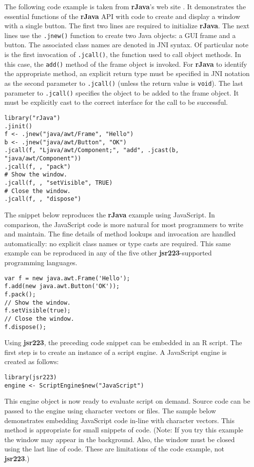 The following code example is taken from \textbf{rJava}'s web site \citep{rjavaweb}. It demonstrates the essential functions of the \textbf{rJava} API with code to create and display a window with a single button. The first two lines are required to initialize \textbf{rJava}. The next lines use the \texttt{.jnew()} function to create two Java objects: a GUI frame and a button. The associated class names are denoted in JNI syntax. Of particular note is the first invocation of \texttt{.jcall()}, the function used to call object methods. In this case, the \texttt{add()} method of the frame object is invoked. For \textbf{rJava} to identify the appropriate method, an explicit return type must be specified in JNI notation as the second parameter to \texttt{.jcall()} (unless the return value is \texttt{void}). The last parameter to \texttt{.jcall()} specifies the object to be added to the frame object. It must be explicitly cast to the correct interface for the call to be successful.

\singlespace
\begin{verbatim}
library("rJava")
.jinit()
f <- .jnew("java/awt/Frame", "Hello")
b <- .jnew("java/awt/Button", "OK")
.jcall(f, "Ljava/awt/Component;", "add", .jcast(b, "java/awt/Component"))
.jcall(f, , "pack")
# Show the window.
.jcall(f, , "setVisible", TRUE)
# Close the window.
.jcall(f, , "dispose")
\end{verbatim}
\doublespace

The snippet below reproduces the \textbf{rJava} example using JavaScript. In comparison, the JavaScript code is more natural for most programmers to write and maintain. The fine details of method lookups and invocation are handled automatically: no explicit class names or type casts are required. This same example can be reproduced in any of the five other \textbf{jsr223}-supported programming languages.
\clearpage
\singlespace
\begin{verbatim}
var f = new java.awt.Frame('Hello');
f.add(new java.awt.Button('OK'));
f.pack();
// Show the window.
f.setVisible(true);
// Close the window.
f.dispose();
\end{verbatim}
\doublespace

Using \textbf{jsr223}, the preceding code snippet can be embedded in an R script. The first step is to create an instance of a script engine. A JavaScript engine is created as follows:

\singlespace
\begin{verbatim}
library(jsr223)
engine <- ScriptEngine$new("JavaScript")
\end{verbatim}
\doublespace
This engine object is now ready to evaluate script on demand. Source code can be passed to the engine using character vectors or files. The sample below demonstrates embedding JavaScript code in-line with character vectors. This method is appropriate for small snippets of code. (Note: If you try this example the window may appear in the background. Also, the window must be closed using the last line of code. These are limitations of the code example, not \textbf{jsr223}.)

